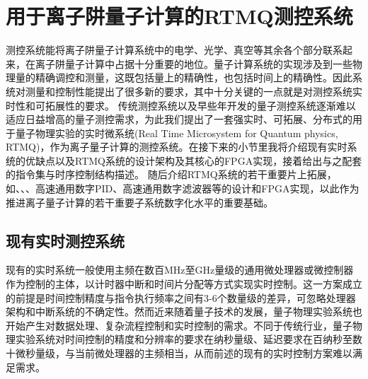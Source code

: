 
\chapter[用于离子阱量子计算的RTMQ测控系统]{用于离子阱量子计算的RTMQ测控系统\label{section:fpga_rtmq}}


测控系统能将离子阱量子计算系统中的电学、光学、真空等其余各个部分联系起来，在离子阱量子计算中占据十分重要的地位。量子计算系统的实现涉及到一些物理量的精确调控和测量，这既包括量上的精确性，也包括时间上的精确性。因此系统对测量和控制性能提出了很多新的要求，其中十分关键的一点就是对测控系统实时性和可拓展性的要求。
传统测控系统以及早些年开发的量子测控系统逐渐难以适应日益增高的量子测控需求，为此我们提出了一套强实时、可拓展、分布式的用于量子物理实验的实时微系统(Real Time Microsystem for Quantum physics, RTMQ)，作为离子量子计算的测控系统。在接下来的小节里我将介绍现有实时系统的优缺点以及RTMQ系统的设计架构及其核心的FPGA实现，接着给出与之配套的指令集与时序控制结构描述。
随后介绍RTMQ系统的若干重要片上拓展，如、、、高速通用数字PID、高速通用数字滤波器等的设计和FPGA实现，以此作为推进离子量子计算的若干重要子系统数字化水平的重要基础。

\section[现有实时测控系统]{现有实时测控系统}


现有的实时系统一般使用主频在数百MHz至GHz量级的通用微处理器或微控制器作为控制的主体，以计时器中断和时间片分配等方式实现实时控制。这一方案成立的前提是时间控制精度与指令执行频率之间有3-6个数量级的差异，可忽略处理器架构和中断系统的不确定性。然而近来随着量子技术的发展，量子物理实验系统也开始产生对数据处理、复杂流程控制和实时控制的需求。不同于传统行业，量子物理实验系统对时间控制的精度和分辨率的要求在纳秒量级、延迟要求在百纳秒至数十微秒量级\cite[]{junhua03}，与当前微处理器的主频相当，从而前述的现有的实时控制方案难以满足需求。


